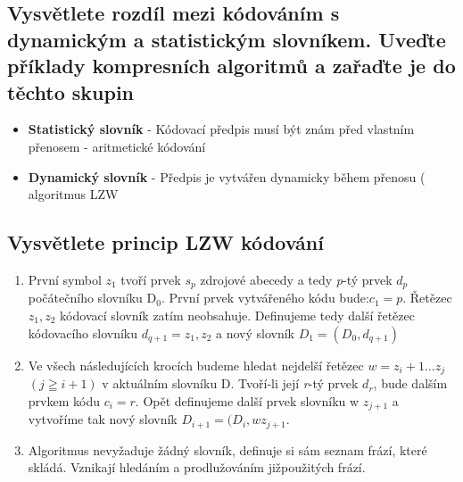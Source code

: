 \subsection{Vysvětlete rozdíl mezi kódováním s dynamickým a statistickým slovníkem. Uveďte příklady kompresních algoritmů a zařaďte je do těchto skupin}
\begin{itemize}
    \item  \textbf{Statistický slovník} - Kódovací předpis musí být znám před vlastním přenosem - aritmetické kódování
    \item \textbf{Dynamický slovník} - Předpis je vytvářen dynamicky během přenosu ( algoritmus LZW
\end{itemize}

\subsection{Vysvětlete princip LZW kódování}
\begin{enumerate}
    \item První symbol $z_1$ tvoří prvek $s_p$ zdrojové abecedy a tedy \emph{p}-tý prvek $d_p$ počátečního slovníku D$_0$.
    První prvek vytvářeného kódu bude:$c_1 = p$.
    Řetězec $z_1, z_2$ kódovací slovník zatím neobsahuje.
    Definujeme tedy další řetězec kódovacího slovníku $d_{q+1} = z_1, z_2$ a nový slovník $D_1=(D_0,d_{q+1}) $
    \item Ve všech následujících krocích budeme hledat nejdelší řetězec $w = z_i+1\dots z_j$ $(j\geqq i+1)$ v aktuálním slovníku D.
    Tvoří-li její \emph{r}-tý prvek $d_r$, bude dalším prvkem kódu $c_i=r$. 
    Opět definujeme další prvek slovníku w $z_{j+1}$ a vytvoříme tak nový slovník $D_{i+1} = (D_i, w\mathrm{ }z_{j+1}$.
    \item Algoritmus nevyžaduje žádný slovník, definuje si sám seznam frází, které skládá. Vznikají hledáním a prodlužováním jižpoužitých frází.
\end{enumerate}
